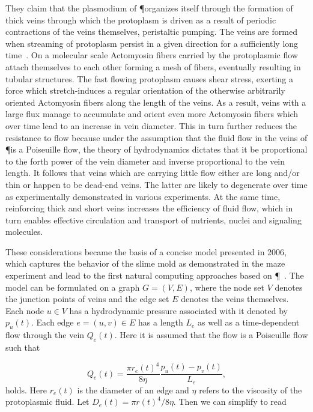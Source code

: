 			They claim that the plasmodium of \P organizes itself through the formation of thick veins through which the protoplasm is driven as a result of periodic contractions of the veins themselves, \ie peristaltic pumping. The veins are formed when streaming of protoplasm persist in a given direction for a sufficiently long time~\cite{nakagaki2000interaction}. On a molecular scale Actomyosin fibers carried by the protoplasmic flow attach themselves to each other forming a mesh of fibers, eventually resulting in tubular structures. The fast flowing protoplasm causes shear stress, exerting a force which stretch-induces a regular orientation of the otherwise arbitrarily oriented Actomyosin fibers along the length of the veins. As a result, veins with a large flux manage to accumulate and orient even more Actomyosin fibers which over time lead to an increase in vein diameter. This in turn further reduces the resistance to flow because under the assumption that the fluid flow in the veins of \P is a Poiseuille flow, the theory of hydrodynamics dictates that it be proportional to the forth power of the vein diameter and inverse proportional to the vein length. It follows that veins which are carrying little flow either are long and/or thin or happen to be dead-end veins. The latter are likely to degenerate over time as experimentally demonstrated in various experiments. At the same time, reinforcing thick and short veins increases the efficiency of fluid flow, which in turn enables effective circulation and transport of nutrients, nuclei and signaling molecules.

			These considerations became the basis of a concise model presented in 2006, which captures the behavior of the slime mold as demonstrated in the maze experiment and lead to the first natural computing approaches based on \P~\cite{Tero2006115}. The model can be formulated on a graph $G = (V,E)$, where the node set $V$ denotes the junction points of veins and the edge set $E$ denotes the veins themselves. Each node $u \in V$ has a hydrodynamic pressure associated with it denoted by $p_u(t)$. Each edge $e = (u,v) \in E$ has a length $L_e$ as well as a time-dependent flow through the vein $Q_e(t)$. Here it is assumed that the flow is a Poiseuille flow such that

			\begin{equation}
				Q_e(t) = \frac{\pi r_e(t)^4}{ 8 \eta} \frac{p_u(t)-p_v(t)}{L_e},
				\label{eq:flow_initial}
			\end{equation}
			holds. Here $r_e(t)$ is the diameter of an edge and $\eta$ refers to the viscosity of the protoplasmic fluid. Let $D_e(t) = \pi r(t)^4/ 8 \eta$. Then we can simplify  to read

